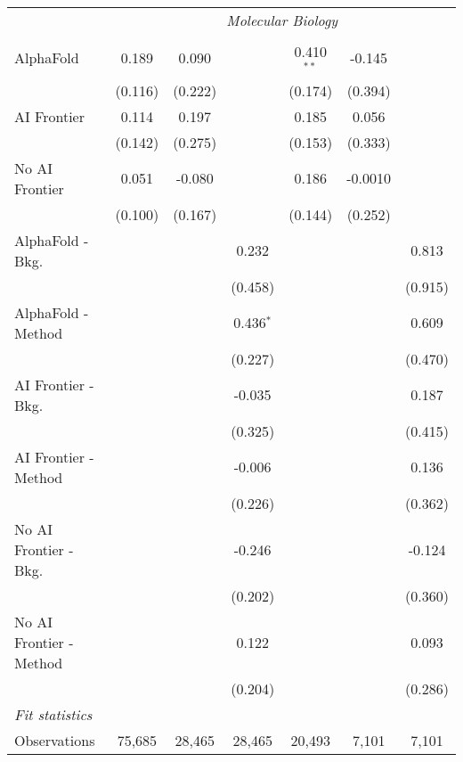 \begin{tabular}{lcccccc}
 & \multicolumn{6}{c}{\textit{Molecular Biology}} \\ \\
   AlphaFold               & 0.189   & 0.090   &             & 0.410$^{**}$ & -0.145  &   \\   
                           & (0.116) & (0.222) &             & (0.174)      & (0.394) &   \\   
   AI Frontier             & 0.114   & 0.197   &             & 0.185        & 0.056   &   \\   
                           & (0.142) & (0.275) &             & (0.153)      & (0.333) &   \\   
   No AI Frontier          & 0.051   & -0.080  &             & 0.186        & -0.0010 &   \\   
                           & (0.100) & (0.167) &             & (0.144)      & (0.252) &   \\   
   AlphaFold - Bkg.        &         &         & 0.232       &              &         & 0.813\\   
                           &         &         & (0.458)     &              &         & (0.915)\\   
   AlphaFold - Method      &         &         & 0.436$^{*}$ &              &         & 0.609\\   
                           &         &         & (0.227)     &              &         & (0.470)\\   
   AI Frontier - Bkg.      &         &         & -0.035      &              &         & 0.187\\   
                           &         &         & (0.325)     &              &         & (0.415)\\   
   AI Frontier - Method    &         &         & -0.006      &              &         & 0.136\\   
                           &         &         & (0.226)     &              &         & (0.362)\\   
   No AI Frontier - Bkg.   &         &         & -0.246      &              &         & -0.124\\   
                           &         &         & (0.202)     &              &         & (0.360)\\   
   No AI Frontier - Method &         &         & 0.122       &              &         & 0.093\\   
                           &         &         & (0.204)     &              &         & (0.286)\\   
   \midrule
   \emph{Fit statistics}\\
   Observations            & 75,685  & 28,465  & 28,465      & 20,493       & 7,101   & 7,101\\  
   

\end{tabular}
